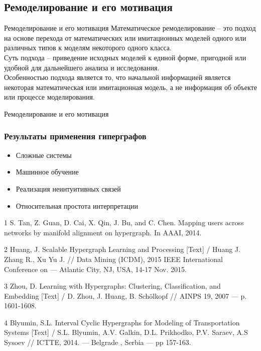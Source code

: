 \documentclass{beamer}
\begin{document}
\begin{darkframes}
	\subsection{Ремоделирование и его мотивация}
		\begin{frame}[label=math]{Ремоделирование и его мотивация}
		\centering
			\alert{Математическое ремоделирование} -- это подход на основе перехода от математических или имитационных моделей одного или различных типов к моделям некоторого одного класса. 
			\\\alert{Суть подхода} -- приведение исходных моделей к единой форме, пригодной или удобной для дальнейшего анализа и исследования.
			\\\alert{Особенностью подхода} является то, что начальной информацией является некоторая математическая или имитационная модель, а не информация об объекте или процессе моделирования. 
		\end{frame}


		\begin{frame}[label=math]{Ремоделирование и его мотивация}
			\frametitle{Результаты применения гиперграфов}
			
				\begin{itemize}
					\centering
					\item \alert{Сложные системы}
					\item \alert{Машинное обучение}
					\item \alert{Реализация неинтуитивных связей}
					\item \alert{Относительная простота интерпретации}
				\end{itemize}
		\begin{flushleft}
		\begin{thebibliography}{9}
		\scriptsize{
				\item[1] S. Tan, Z. Guan, D. Cai, X. Qin, J. Bu, and C. Chen. Mapping users across networks by manifold alignment on hypergraph. In AAAI, 2014. 

				\item[2] Huang, J. Scalable Hypergraph Learning and Processing [Text] / Huang J. Zhang R.,  Xu Yu J. // Data Mining (ICDM), 2015 IEEE International Conference on --- Atlantic City, NJ, USA, 14-17 Nov. 2015. 
			
				\item[3]  Zhou, D. Learning with Hypergraphs: Clustering, Classification, and Embedding [Text] / D. Zhou, J. Huang, B. Schölkopf // AINPS 19, 2007 --- p. 1601-1608.
				\item[4]  Blyumin, S.L. Interval Cyclic Hypergraphs for Modeling of Transportation Systems [Text] / S.L. Blyumin, A.V. Galkin, D.L. Prikhodko, P.V. Saraev, A.S Sysoev // ICTTE, 2014. ---  Belgrade , Serbia --- pp 157-163. }
		\end{thebibliography}
		\end{flushleft}


\end{frame}
\end{darkframes}
\end{document}
